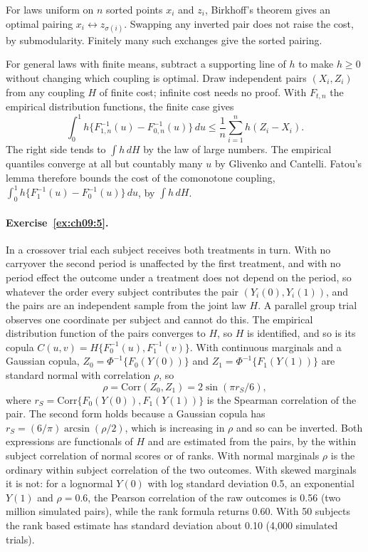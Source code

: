 For laws uniform on $n$ sorted points $x_i$ and $z_i$, Birkhoff's theorem gives an optimal pairing $x_i \leftrightarrow z_{\sigma(i)}$. Swapping any inverted pair does not raise the cost, by submodularity. Finitely many such exchanges give the sorted pairing.

For general laws with finite means, subtract a supporting line of $h$ to make $h \ge 0$ without changing which coupling is optimal. Draw independent pairs $(X_i, Z_i)$ from any coupling $H$ of finite cost; infinite cost needs no proof. With $F_{t,n}$ the empirical distribution functions, the finite case gives
\[
\int_0^1 h\{F_{1,n}^{-1}(u) - F_{0,n}^{-1}(u)\}\,du \le \frac1n\sum_{i=1}^n h(Z_i - X_i).
\]
The right side tends to $\int h\,dH$ by the law of large numbers. The empirical quantiles converge at all but countably many $u$ by Glivenko and Cantelli. Fatou's lemma therefore bounds the cost of the comonotone coupling, $\int_0^1 h\{F_1^{-1}(u) - F_0^{-1}(u)\}\,du$, by $\int h\,dH$.

\paragraph{Exercise~\ref{ex:ch09:5}.} In a crossover trial each subject receives both treatments in turn. With no carryover the second period is unaffected by the first treatment, and with no period effect the outcome under a treatment does not depend on the period, so whatever the order every subject contributes the pair $(Y_i(0), Y_i(1))$, and the pairs are an independent sample from the joint law $H$. A parallel group trial observes one coordinate per subject and cannot do this. The empirical distribution function of the pairs converges to $H$, so $H$ is identified, and so is its copula $C(u, v) = H\{F_0^{-1}(u), F_1^{-1}(v)\}$. With continuous marginals and a Gaussian copula, $Z_0 = \Phi^{-1}\{F_0(Y(0))\}$ and $Z_1 = \Phi^{-1}\{F_1(Y(1))\}$ are standard normal with correlation $\rho$, so
\[
\rho = \mathrm{Corr}(Z_0, Z_1) = 2\sin(\pi r_S/6),
\]
where $r_S = \mathrm{Corr}\{F_0(Y(0)), F_1(Y(1))\}$ is the Spearman correlation of the pair. The second form holds because a Gaussian copula has $r_S = (6/\pi)\arcsin(\rho/2)$, which is increasing in $\rho$ and so can be inverted. Both expressions are functionals of $H$ and are estimated from the pairs, by the within subject correlation of normal scores or of ranks. With normal marginals $\rho$ is the ordinary within subject correlation of the two outcomes. With skewed marginals it is not: for a lognormal $Y(0)$ with log standard deviation 0.5, an exponential $Y(1)$ and $\rho = 0.6$, the Pearson correlation of the raw outcomes is 0.56 (two million simulated pairs), while the rank formula returns 0.60. With 50 subjects the rank based estimate has standard deviation about 0.10 (4{,}000 simulated trials).

